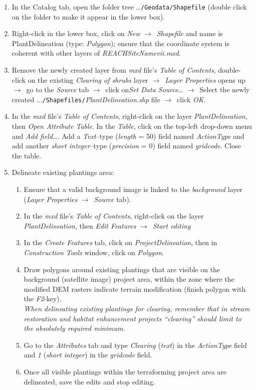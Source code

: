 \begin{enumerate}
\def\labelenumi{\arabic{enumi})}
\item In the Catalog tab, open the folder tree \ldots{}\texttt{/Geodata/Shapefile} (double click on the folder to make it appear in the lower box).
\item Right-click in the lower box, click on \emph{New} $\rightarrow$~\emph{Shapefile} and name is PlantDelineation (type: \emph{Polygon}); ensure that the coordinate system is coherent with other layers of \emph{REACH{\myUnderscore}SiteName{\myUnderscore}vii.mxd}.
\item Remove the newly created layer from \emph{mxd} file's \emph{Table of Contents}, double-click on the existing \emph{Clearing of shrubs} layer $\rightarrow$~\emph{Layer Properties} opens up $\rightarrow$~go to the \emph{Source} tab $\rightarrow$~click on\emph{Set Data Source}\ldots{} $\rightarrow$~Select the newly created ...\texttt{/Shapefiles/}\emph{PlantDelineation.shp} file $\rightarrow$~click \emph{OK}.
\item In the \emph{mxd} file's \emph{Table of Contents}, right-click on the layer \emph{PlantDelineation}, then \emph{Open Attribute Table}. In the \emph{Table}, click on the top-left drop-down menu and \emph{Add field\ldots{}}. Add a \emph{Text}--type (\emph{length} = 50) field named \emph{ActionType} and add another \emph{short integer}--type (\emph{precision} = 0) field named \emph{gridcode}. Close the table. 
\item Delineate existing plantings area:
  \begin{enumerate}
  \def\labelenumii{\alph{enumii}.}
  \item
    Ensure that a valid background image is linked to the \emph{background} layer (\emph{Layer Properties} $\rightarrow$~\emph{Source} tab).
  \item In the \emph{mxd} file's \emph{Table of Contents}, right-click on the layer \emph{PlantDelineation}, then \emph{Edit Features} $\rightarrow$~\emph{Start editing}  
  \item In the \emph{Create Features} tab, click on \emph{ProjectDelineation}, then in \emph{Construction Tools} window, click on \emph{Polygon}.
  \item Draw polygons around existing plantings that are visible on the background (satellite image) project area, within the zone where the modified DEM rasters indicate terrain modification (finish polygon with the \emph{F2}-key).\\
    \textit{When delineating existing plantings for clearing, remember that in stream restoration and habitat enhancement projects ``clearing'' should limit to the absolutely required minimum.}
  \item Go to the \emph{Attributes} tab and type \emph{Clearing} (\emph{text}) in the \emph{ActionType} field and \emph{1} (\emph{short integer}) in the \emph{gridcode} field.
  \item Once all visible plantings within the terraforming project area are delineated, save the edits and stop editing.
  \end{enumerate}
\end{enumerate}

